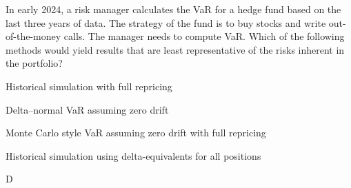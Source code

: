\documentclass{article}
\newcounter{question} %
\begin{document}
\begin{question}
    In early 2024, a risk manager calculates the VaR for a hedge fund based on the last three years of data. The strategy of the fund is to buy stocks and write out-of-the-money calls. The manager needs to compute VaR. Which of the following methods would yield results that are least representative of the risks inherent in the portfolio?
\end{question}

\begin{choices}
    \item Historical simulation with full repricing
    \item Delta–normal VaR assuming zero drift
    \item Monte Carlo style VaR assuming zero drift with full repricing
    \item Historical simulation using delta-equivalents for all positions
\end{choices}

\begin{correctanswer}
    D
\end{correctanswer}
\end{document}
